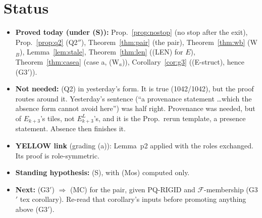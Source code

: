 \documentclass[11pt]{article}
\theoremstyle{remark}\newtheorem{remark}[theorem]{Remark}
\begin{document}
\section{Status}
\begin{itemize}
\item \textbf{Proved today (under (S)):} Prop.~\ref{prop:nostop} (no stop after the exit), Prop.~\ref{prop:q2} (Q2$''$), Theorem~\ref{thm:pair} (the pair), Theorem~\ref{thm:wb} (W$_B$), Lemma~\ref{lem:stale}, Theorem~\ref{thm:len} ((LEN) for $E$), Theorem~\ref{thm:casea} (case a, (W$_a$)), Corollary~\ref{cor:g3} ((E-struct), hence (G3$'$)).
\item \textbf{Not needed:} (Q2) in yesterday's form. It is true (1042/1042), but the proof routes around it. Yesterday's sentence (``a provenance statement \dots which the absence form cannot avoid here'') was half right. Provenance was needed, but of $E_{k+3}$'s tiles, not $E^L_{k+3}$'s, and it is the Prop.~rerun template, a presence statement. Absence then finishes it.
\item \textbf{YELLOW link} (grading (a)): Lemma~p2 applied with the roles exchanged. Its proof is role-symmetric.
\item \textbf{Standing hypothesis:} (S), with (Mos) computed only.
\item \textbf{Next:} (G3$'$) $\Rightarrow$ (MC) for the pair, given PQ-RIGID and $\mathcal F$-membership (G3$'$ tex corollary). Re-read that corollary's inputs before promoting anything above (G3$'$).
\end{itemize}
\end{document}

